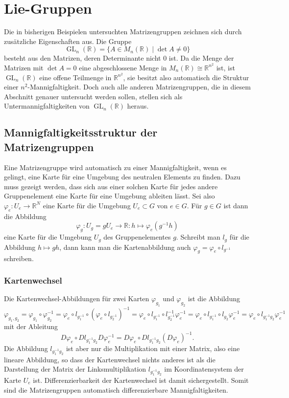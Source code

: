 %
%
%
\section{Lie-Gruppen
\label{buch:section:lie-gruppen}}
Die in bisherigen Beispielen untersuchten Matrizengruppen zeichnen sich
durch zusätzliche Eigenschaften aus.
Die Gruppe
\[
\operatorname{GL}_n(\mathbb{R}) 
=
\{ A \in M_n(\mathbb{R}) \mid \det A \ne 0\}
\]
besteht aus den Matrizen, deren Determinante nicht $0$ ist.
Da die Menge der Matrizen mit $\det A=0$ eine abgeschlossene Menge
in $M_n(\mathbb{R}) \cong \mathbb{R}^{n^2}$ ist, ist
$\operatorname{GL}_n(\mathbb{R})$ eine offene Teilmenge in $\mathbb{R}^{n^2}$,
sie besitzt also automatisch die Struktur einer $n^2$-Mannigfaltigkeit.
Doch auch alle anderen Matrizengruppen,
die in diesem Abschnitt genauer untersucht werden sollen,
stellen sich als Untermannigfaltigkeiten von
$\operatorname{GL}_n(\mathbb{R})$ heraus.

\subsection{Mannigfaltigkeitsstruktur der Matrizengruppen
\label{buch:subsection:mannigfaltigkeitsstruktur-der-matrizengruppen}}
Eine Matrizengruppe wird automatisch zu einer Mannigfaltigkeit,
wenn es gelingt, eine Karte für eine Umgebung des neutralen Elements
zu finden.
Dazu muss gezeigt werden, dass sich aus einer solchen Karte für jedes
andere Gruppenelement eine Karte für eine Umgebung ableiten lässt.
Sei also $\varphi_e\colon U_e \to \mathbb{R}^N$ eine Karte für die Umgebung
$U_e\subset G$ von $e\in G$.
Für $g\in G$ ist dann die Abbildung
\[
\varphi_g
\colon
U_g
=
gU_e
\to
\mathbb{R}
:
h\mapsto \varphi_e(g^{-1}h)
\]
eine Karte für die Umgebung $U_g$ des Gruppenelementes $g$.
Schreibt man $l_{g}$ für  die Abbildung $h\mapsto gh$, dann
kann man die Kartenabbildung auch $\varphi_g = \varphi_e\circ l_{g^{-1}}$
schreiben.

\subsubsection{Kartenwechsel}
Die Kartenwechsel-Abbildungen für zwei Karten $\varphi_{g_1}$
und $\varphi_{g_2}$ ist die Abbildung
\[
\varphi_{g_1,g_2}
=
\varphi_{g_1}\circ \varphi_{g_2}^{-1}
=
\varphi_e\circ l_{g_1^{-1}} \circ (\varphi_e\circ l_{g_2^{-1}})^{-1}
=
\varphi_e\circ l_{g_1^{-1}} \circ l_{g_2^{-1}}^{-1} \varphi_e^{-1}
=
\varphi_e\circ l_{g_1^{-1}} \circ l_{g_2}\varphi_e^{-1}
=
\varphi_e\circ l_{g_1^{-1}g_2}\varphi_e^{-1}
\]
mit der Ableitung
\[
D\varphi_e\circ Dl_{g_1^{-1}g_2} D\varphi_e^{-1}
=
D\varphi_e\circ Dl_{g_1^{-1}g_2} (D\varphi_e)^{-1}.
\]
Die Abbildung $l_{g_1^{-1}g_2}$ ist aber nur die Multiplikation mit
einer Matrix, also eine lineare Abbildung, so dass der Kartenwechsel
nichts anderes ist als die Darstellung der Matrix der Linksmultiplikation
$l_{g_1^{-1}g_2}$ im Koordinatensystem der Karte $U_e$ ist.
Differenzierbarkeit der Kartenwechsel ist damit sichergestellt.
Somit sind
die Matrizengruppen automatisch differenzierbare Mannigfaltigkeiten.


